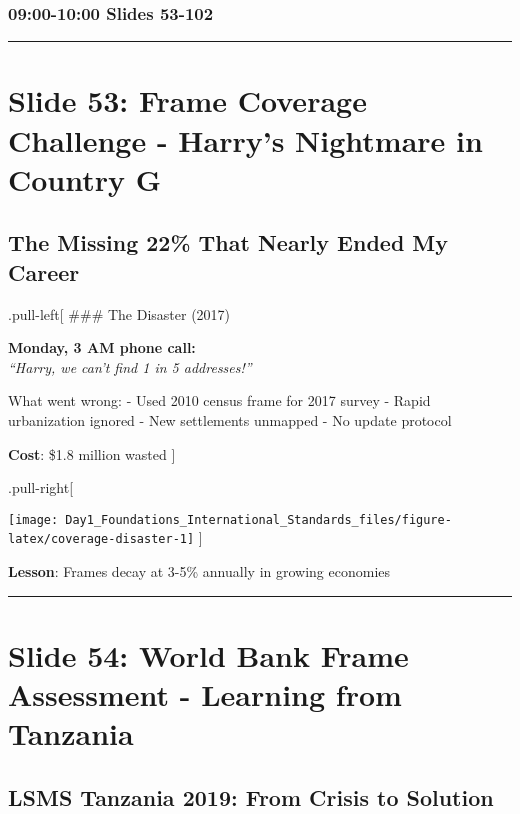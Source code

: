 \documentclass[
]{article}
\begin{document}
\subsubsection{09:00-10:00 \textbar{} Slides
53-102}\label{slides-53-102}

\begin{center}\rule{0.5\linewidth}{0.5pt}\end{center}

\section{Slide 53: Frame Coverage Challenge - Harry's Nightmare in
Country
G}\label{slide-53-frame-coverage-challenge---harrys-nightmare-in-country-g}

\subsection{The Missing 22\% That Nearly Ended My
Career}\label{the-missing-22-that-nearly-ended-my-career}

.pull-left{[} \#\#\# The Disaster (2017)

\textbf{Monday, 3 AM phone call:}\\
\emph{``Harry, we can't find 1 in 5 addresses!''}

What went wrong: - Used 2010 census frame for 2017 survey - Rapid
urbanization ignored - New settlements unmapped - No update protocol

\textbf{Cost}: \$1.8 million wasted {]}

.pull-right{[}

\texttt{[image: Day1\_Foundations\_International\_Standards\_files/figure-latex/coverage-disaster-1]}
{]}

\textbf{Lesson}: Frames decay at 3-5\% annually in growing economies

\begin{center}\rule{0.5\linewidth}{0.5pt}\end{center}

\section{Slide 54: World Bank Frame Assessment - Learning from
Tanzania}\label{slide-54-world-bank-frame-assessment---learning-from-tanzania}

\subsection{LSMS Tanzania 2019: From Crisis to
Solution}\label{lsms-tanzania-2019-from-crisis-to-solution}
\end{document}
